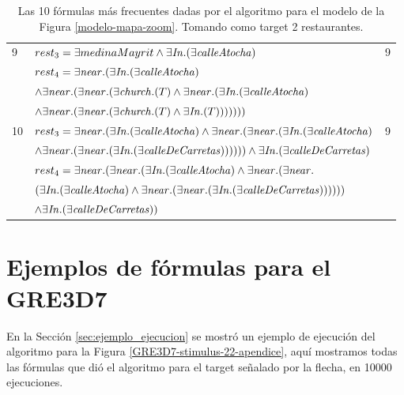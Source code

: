 \begin{table}[H]
\begin{center}
\begin{tabular}{|l|l|c|}
9&$rest_3 =\exists medinaMayrit \land \exists \mathit{In}.(\exists \mathit{calleAtocha})$ & 9\\
&$rest_4 = \exists \mathit{near}.(\exists \mathit{In}.(\exists \mathit{calleAtocha}) $ & \\
&$ \land \exists \mathit{near}.(\exists \mathit{near}.(\exists \mathit{church}.(T)  \land \exists \mathit{near}.(\exists \mathit{In}.(\exists \mathit{calleAtocha})  $ & \\
&$\land \exists \mathit{near}.(\exists \mathit{near}.(\exists \mathit{church}.(T)  \land \exists \mathit{In}.(T)))))))$&\\ \hline

10&$rest_3 = \exists \mathit{near}.(\exists \mathit{In}.(\exists \mathit{calleAtocha})  \land \exists \mathit{near}.(\exists \mathit{near}.(\exists \mathit{In}.(\exists \mathit{calleAtocha}) $ & 9\\
&$ \land \exists \mathit{near}.(\exists \mathit{near}.(\exists \mathit{In}.(\exists \mathit{calleDeCarretas}))))))  \land \exists \mathit{In}.(\exists \mathit{calleDeCarretas})  $ & \\
&$rest_4 = \exists \mathit{near}.(\exists \mathit{near}.(\exists \mathit{In}.(\exists \mathit{calleAtocha})  \land \exists \mathit{near}.(\exists \mathit{near}.$ & \\
&$(\exists \mathit{In}.(\exists \mathit{calleAtocha})  \land \exists \mathit{near}.(\exists \mathit{near}.(\exists \mathit{In}.(\exists \mathit{calleDeCarretas})))))) $ & \\
&$ \land \exists \mathit{In}.(\exists \mathit{calleDeCarretas}))$&\\ \hline

\end{tabular}

\caption{Las 10 f\'ormulas m\'as frecuentes dadas por el algoritmo para el modelo de la Figura \protect\ref{modelo-mapa-zoom}. Tomando como target 2 restaurantes.}\label{formulas-mapa-zoom2-apendice}
\end{center}
\end{table}

\section{Ejemplos de f\'ormulas para el GRE3D7}

En la Secci\'on \ref{sec:ejemplo_ejecucion} se mostr\'o un ejemplo de ejecuci\'on del algoritmo para la Figura \ref{GRE3D7-stimulus-22-apendice}, aqu\'i mostramos todas las f\'ormulas que di\'o el algoritmo para el target se\~nalado por la flecha, en 10000 ejecuciones.

